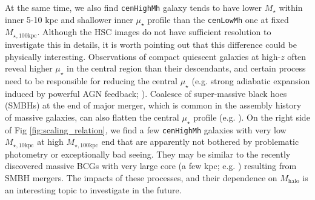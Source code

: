 \documentclass[a4paper,fleqn,usenatbib]{mnras}
\def\rbcg{\texttt{cenHighMh}}
\def\nbcg{\texttt{cenLowMh}}
\def\mstar{{$M_{\star}$}}
\def\mhalo{{$M_{\mathrm{halo}}$}}
\def\minn{{$M_{\star,10\mathrm{kpc}}$}}
\def\mtot{{$M_{\star,100\mathrm{kpc}}$}}
\def\mden{{$\mu_{\star}$}}
\begin{document}
    At the same time, we also find \rbcg{} galaxy tends to have lower \mstar{} within 
    inner 5-10 kpc and shallower inner \mden{} profile than the \nbcg{} one at 
    fixed \mtot{}. 
    Although the HSC images do not have sufficient resolution to investigate this in 
    details, it is worth pointing out that this difference could be physically 
    interesting. 
    Observations of compact quiescent galaxies at high-$z$ often reveal higher 
    \mden{} in the central region than their descendants, and certain process need to  
    be responsible for reducing the central \mden{} (e.g. strong adiabatic expansion 
    induced by powerful AGN feedback; \citealt{Fan2008}).
    Coalesce of super-massive black hoes (SMBHs) at the end of major merger, which is 
    common in the assembly history of massive galaxies, can also flatten the central 
    \mden{} profile (e.g. \citealt{Milosavljevi2002}).
    On the right side of Fig \ref{fig:scaling_relation}, we find a few \rbcg{} galaxies 
    with very low \minn{} at high \mtot{} end that are apparently not bothered by 
    problematic photometry or exceptionally bad seeing.  
    They may be similar to the recently discovered massive BCGs with very large core 
    (a few kpc; e.g. \citealt{Postman2012, LopezCruz2014}) resulting from SMBH mergers.
    The impacts of these processes, and their dependence on \mhalo{} is an interesting 
    topic to investigate in the future.
\end{document}
